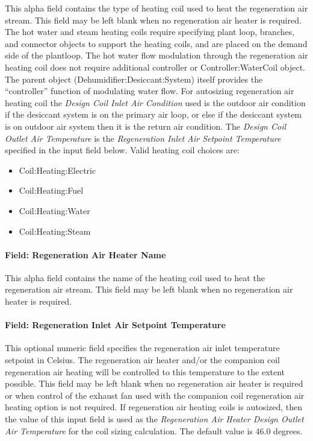 This alpha field contains the type of heating coil used to heat the regeneration air stream. This field may be left blank when no regeneration air heater is required. The hot water and steam heating coils require specifying plant loop, branches, and connector objects to support the heating coils, and are placed on the demand side of the plantloop. The hot water flow modulation through the regeneration air heating coil does not require additional controller or Controller:WaterCoil object. The parent object (Dehumidifier:Desiccant:System) itself provides the ``controller'' function of modulating water flow. For autosizing regeneration air heating coil the \emph{Design Coil Inlet Air Condition} used is the outdoor air condition if the desiccant system is on the primary air loop, or else if the desiccant system is on outdoor air system then it is the return air condition. The \emph{Design Coil Outlet Air Temperature} is the \emph{Regeneration Inlet Air Setpoint Temperature} specified in the input field below. Valid heating coil choices are:

\begin{itemize}
\item
  Coil:Heating:Electric
\item
  Coil:Heating:Fuel
\item
  Coil:Heating:Water
\item
  Coil:Heating:Steam
\end{itemize}

\paragraph{Field: Regeneration Air Heater Name}\label{field-regeneration-air-heater-name}

This alpha field contains the name of the heating coil used to heat the regeneration air stream. This field may be left blank when no regeneration air heater is required.

\paragraph{Field: Regeneration Inlet Air Setpoint Temperature}\label{field-regeneration-inlet-air-setpoint-temperature}

This optional numeric field specifies the regeneration air inlet temperature setpoint in Celsius. The regeneration air heater and/or the companion coil regeneration air heating will be controlled to this temperature to the extent possible. This field may be left blank when no regeneration air heater is required or when control of the exhaust fan used with the companion coil regeneration air heating option is not required. If regeneration air heating coils is autosized, then the value of this input field is used as the \emph{Regeneration Air Heater Design Outlet Air Temperature} for the coil sizing calculation. The default value is 46.0 degrees.


